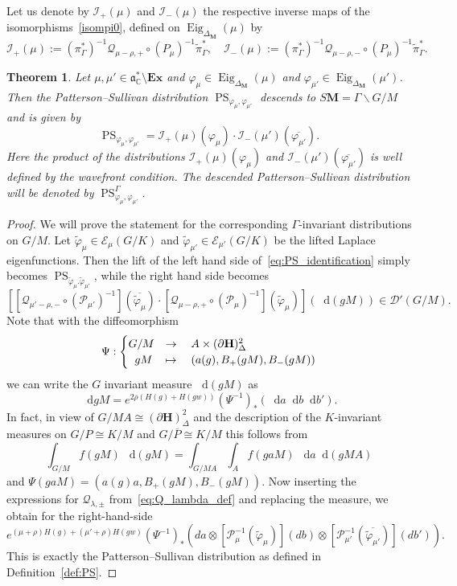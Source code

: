 \documentclass[10pt]{amsart}
\newtheorem{theo}[cdrthm]{Theorem}
\theoremstyle{definition}
\DeclareMathOperator{\Eig}{Eig}
\newcommand{\mc}{\mathcal}
\newcommand{\cc}{\mathbb{C}}
\newcommand{\bfh}{\mathbf{H}}
\newcommand{\bfm}{\mathbf{M}}
\newcommand{\pl}{\partial}
\newcommand{\til}{\widetilde}
\newcommand{\intd}{\mathop{}\!\mathrm{d}}
\renewcommand{\a}{\mathfrak a}
\begin{document}
Let us denote by $\mc{I}_+(\mu)$ and $\mc{I}_-(\mu)$ the respective inverse maps of the isomorphisms~\eqref{isompi0}, defined on $\Eig_{\Delta_{\bfm}}(\mu)$ by
\[
\mc{I}_+(\mu):=(\pi_\Gamma^*)^{-1}\mathcal Q_{\mu-\rho,+}\circ(P_{\mu})^{-1}\til\pi_\Gamma^*,\quad
\mc{I}_-(\mu):=(\pi_\Gamma^*)^{-1}\mathcal Q_{\mu-\rho,-}\circ(P_{\mu})^{-1}\til\pi_\Gamma^*.
\]
\begin{theo}\label{thm:patterson_sullivan}
Let $\mu,\mu'\in \a^*_\cc\setminus\mathbf{Ex}$ and $\varphi_\mu \in \Eig_{\Delta_{\bfm}}(\mu)$ and $\varphi_{\mu'} \in \Eig_{\Delta_{\bfm}}(\mu')$. Then the Patterson--Sullivan distribution $ \operatorname{PS}_{\varphi_\mu,\varphi_{\mu'}}$ descends to $S{\bfm}=\Gamma\backslash G/M$ and is given by
\begin{equation}\label{eq:PS_identification}
\operatorname{PS}_{\varphi_\mu,\varphi_{\mu'}} = \mathcal I_+(\mu)(\varphi_{\mu})\cdot \mathcal I_-(\mu')(\overline{\varphi_{\mu'}}).
\end{equation}
Here the product of the distributions $\mathcal I_+(\mu)(\varphi_\mu)$ and $\mathcal I_-(\mu')(\overline{\varphi_{\mu'}})$ is well defined by the wavefront condition. The descended Patterson--Sullivan distribution will be denoted by $\operatorname{PS}^\Gamma_{\varphi_\mu,\varphi_{\mu'}}$.
\end{theo}


\begin{proof}
We will prove the statement for the corresponding $\Gamma$-invariant distributions on $G/M$. Let $\til \varphi_\mu\in \mathcal E_\mu(G/K)$ and $\til\varphi_{\mu'}\in \mathcal E_{\mu'}(G/K)$ be the lifted Laplace eigenfunctions. Then the lift of the left hand side of~\eqref{eq:PS_identification} simply becomes $\operatorname{PS}_{\til \varphi_\mu.\til \varphi_{\mu'}}$, while the right hand side becomes
\[
\left[\left[\mathcal Q_{\mu'-\rho,-}\circ(\mathcal P_{\mu'})^{-1}\right](\overline {\til\varphi_\mu})\cdot \left[\mathcal Q_{\mu-\rho,+}\circ(\mathcal P_{\mu})^{-1}\right] (\til\varphi_{\mu})\right](\intd (gM))
\in\mc{D}'(G/M).
\]
Note that with the diffeomorphism
\[
\Psi:
\begin{cases}
G/M &\rightarrow\quad A\times \mathcal (\pl{\bfh})_\Delta^2\\
\mkern10mu gM &\mapsto\quad (a(g), B_+(gM), B_-(gM))
\end{cases}
\]
we can write the $G$ invariant measure $\intd (gM)$ as
\[
\intd gM = e^{2\rho(H(g) + H(gw))} (\Psi^{-1})_* (\intd a\intd b\intd b').
\]
In fact, in view of $G/MA\cong (\pl{\bfh})^2_\Delta$ and the description of the $K$-invariant measures on $G/P\cong K/M$ and $G/\overline P\cong K/M$ this follows from
\[
\int_{G/M} f(gM)~\intd (gM) =
\int_{G/MA}\int_A f(gaM)~\intd a\intd (gMA)
\]
and $\Psi(gaM)=(a(g)a,B_+(gM), B_-(gM))$. Now inserting the expressions for $\mathcal Q_{\lambda,\pm}$ from~\eqref{eq:Q_lambda_def} and replacing the measure, we obtain for the right-hand-side
\[
e^{(\mu+\rho)H(g) + (\mu'+\rho)H(gw)}(\Psi^{-1})_*\left(da \otimes \left[\mathcal P_{\mu}^{-1}(\til\varphi_{\mu})\right](db)
\otimes \left[\mathcal P_{\mu'}^{-1}(\overline{\til\varphi_{\mu'}})\right](db')
\right).
\]
This is exactly the Patterson--Sullivan distribution as defined in Definition~\ref{def:PS}.
\end{proof}
\end{document}
